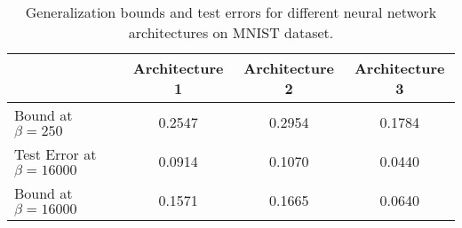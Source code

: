 
\begin{table}[h]
\centering
\begin{tabular}{|l|c|c|c|}
\hline
& Architecture 1 & Architecture 2 & Architecture 3 \\
\hline
Bound at $\beta = 250$ & 0.2547 & 0.2954 & 0.1784 \\
\hline
Test Error at $\beta = 16000$ & 0.0914 & 0.1070 & 0.0440 \\
\hline
Bound at $\beta = 16000$ & 0.1571 & 0.1665 & 0.0640 \\
\hline
\end{tabular}
\caption{Generalization bounds and test errors for different neural network architectures on MNIST dataset.}
\label{tab:mnist_results}
\end{table}
